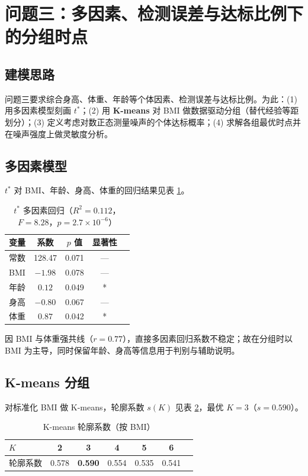 \documentclass[12pt,a4paper]{article}
\begin{document}
\section{问题三：多因素、检测误差与达标比例下的分组时点}
\subsection{建模思路}
问题三要求综合身高、体重、年龄等个体因素、检测误差与达标比例。为此：(1) 用多因素模型刻画 $t^*$；(2) 用 \textbf{K-means} 对 BMI 做数据驱动分组（替代经验等距划分）；(3) 定义考虑对数正态测量噪声的个体达标概率；(4) 求解各组最优时点并在噪声强度上做灵敏度分析。

\subsection{多因素模型}
$t^*$ 对 BMI、年龄、身高、体重的回归结果见表 \ref{tab:multifactor}。

\begin{table}[H]
\centering
\caption{$t^*$ 多因素回归（$R^2=0.112$，$F=8.28$，$p=2.7\times10^{-6}$）}
\label{tab:multifactor}
\begin{tabular}{lcccc}
\toprule
变量 & 系数 & $p$ 值 & 显著性 \\
\midrule
常数 & 128.47 & 0.071 & — \\
BMI     & $-1.98$ & 0.078 & — \\
年龄     & $0.12$  & 0.049 & * \\
身高     & $-0.80$ & 0.067 & — \\
体重     & $0.87$  & 0.042 & * \\
\bottomrule
\end{tabular}
\end{table}

因 BMI 与体重强共线（$r=0.77$），直接多因素回归系数不稳定；故在分组时以 BMI 为主导，同时保留年龄、身高等信息用于判别与辅助说明。

\subsection{K-means 分组}
对标准化 BMI 做 K-means，轮廓系数 $s(K)$ 见表 \ref{tab:sil}，最优 $K=3$（$s=0.590$）。

\begin{table}[H]
\centering
\caption{K-means 轮廓系数（按 BMI）}
\label{tab:sil}
\begin{tabular}{lcccccc}
\toprule
$K$ & 2 & 3 & 4 & 5 & 6 \\
\midrule
轮廓系数 & 0.578 & \textbf{0.590} & 0.554 & 0.535 & 0.541 \\
\bottomrule
\end{tabular}
\end{table}
\end{document}
